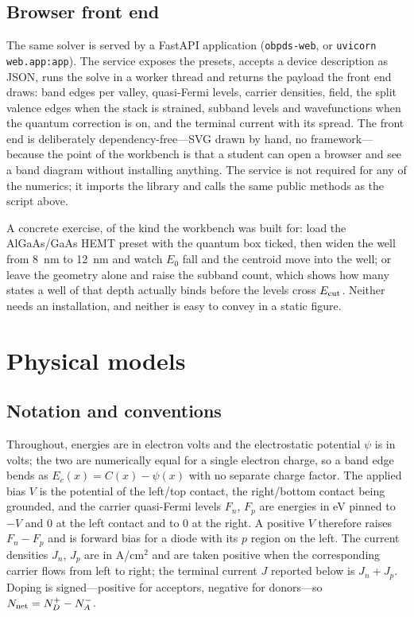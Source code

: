 \documentclass[preprint,12pt]{elsarticle}
\begin{document}
\subsection{Browser front end}

The same solver is served by a FastAPI application (\texttt{obpds-web}, or
\texttt{uvicorn web.app:app}). The service exposes the presets, accepts a
device description as JSON, runs the solve in a worker thread and returns the
payload the front end draws: band edges per valley, quasi-Fermi levels, carrier
densities, field, the split valence edges when the stack is strained, subband
levels and wavefunctions when the quantum correction is on, and the terminal
current with its spread. The front end is deliberately dependency-free---SVG
drawn by hand, no framework---because the point of the workbench is that a
student can open a browser and see a band diagram without installing anything.
The service is not required for any of the numerics; it imports the library
and calls the same public methods as the script above.

A concrete exercise, of the kind the workbench was built for: load the
AlGaAs/GaAs HEMT preset with the quantum box ticked, then widen the well from
\SI{8}{nm} to \SI{12}{nm} and watch $E_0$ fall and the centroid move into the
well; or leave the geometry alone and raise the subband count, which shows how
many states a well of that depth actually binds before the levels cross
$E_{\rm cut}$. Neither needs an installation, and neither is easy to convey
in a static figure.

\section{Physical models}
\label{sec:model}

\subsection{Notation and conventions}

Throughout, energies are in electron volts and the electrostatic potential
$\psi$ is in volts; the two are numerically equal for a single electron
charge, so a band edge bends as $E_c(x)=C(x)-\psi(x)$ with no separate
charge factor. The applied bias $V$ is the potential of the left/top contact,
the right/bottom contact being grounded, and the carrier quasi-Fermi levels
$F_n$, $F_p$ are energies in eV pinned to $-V$ and $0$ at the left contact
and to $0$ at the right. A positive $V$ therefore raises $F_n-F_p$ and is
forward bias for a diode with its $p$ region on the left. The current
densities $J_n$, $J_p$ are in A/cm$^2$ and are taken positive when the
corresponding carrier flows from left to right; the terminal current $J$
reported below is $J_n+J_p$. Doping is signed---positive for acceptors,
negative for donors---so $N_{\rm net}=N_D^{+}-N_A^{-}$.
\end{document}
